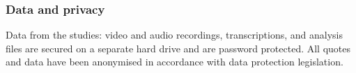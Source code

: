 \subsubsection{Data and privacy}\label{sec: polaris-ethics-data}
Data from the studies: video and audio recordings, transcriptions, and analysis files are secured on a separate hard drive and are password protected. All quotes and data have been anonymised in accordance with data protection legislation.



